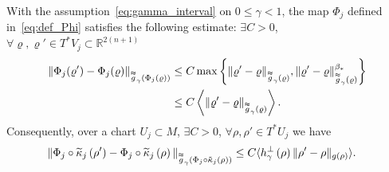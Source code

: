 \documentclass[AHL,Unicode,longabstracts,published]{cedram}
\newcommand{\bbR}{\mathbb{R}}
\let\oldtilde\tilde
\renewcommand*{\tilde}[1]{\mathchoice{\widetilde{#1}}{\widetilde{#1}}{\oldtilde{#1}}{\oldtilde{#1}}}
\let\oldexists\exists
\renewcommand*{\exists}{\mathrel{\oldexists}}
\let\oldforall\forall
\renewcommand*{\forall}{\mathrel{\oldforall}}
\newcommand{\bbR}{\mathbb{R}}
\begin{document}
\begin{cBoxB}{}
\begin{prop}
With the assumption~\eqref{eq:gamma_interval} on $0\leq\gamma<1$, the map $\Phi_{j}$ defined in~\eqref{eq:def_Phi} satisfies the following estimate: $\exists C>0$, $\forall\varrho,\varrho'\in T^{*}V_{j}\subset\bbR^{2(n+1)}$
\begin{equation}\label{eq:Phi_Lipchitz}
\begin{split}
\left\|\Phi_{j}(\varrho')-\Phi_{j}(\varrho)\right\|_{\overset{\thickapprox}{g}_{\gamma}\left(\Phi_{j}\left(\varrho\right)\right)} & \le C\max\left\{ \|\varrho'-\varrho\|_{\overset{\thickapprox}{g}_{\gamma}\left(\varrho\right)},\|\varrho'-\varrho\|_{\overset{\thickapprox}{g}_{\gamma}\left(\varrho\right)}^{\beta_{*}}\right\} 
\\
& \le C\left\langle\|\varrho'-\varrho\|_{\overset{\thickapprox}{g}_{\gamma}\left(\varrho\right)}\right\rangle.
\end{split}
\end{equation}
Consequently, over a chart $U_{j}\subset M$, $\exists C>0$, $\forall\rho,\rho'\in T^{*}U_{j}$ we have
\begin{align}\label{eq:Phi_Lipchitz-1}
\|\Phi_{j}\circ\tilde{\kappa}_{j}\left(\rho'\right)-\Phi_{j}\circ\tilde{\kappa}_{j}\left(\rho\right)\|_{\overset{\thickapprox}{g}_{\gamma}\left(\Phi_{j}\circ\tilde{\kappa}_{j}\left(\rho\right)\right)} & \le C\langle h_{\gamma}^{\perp}\left(\rho\right)\|\rho'-\rho\|_{g\left(\rho\right)}\rangle.
\end{align}
\end{prop}
\end{cBoxB}
\end{document}
